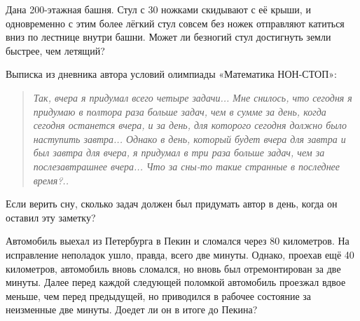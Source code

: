 ﻿

\begin{itemize}
\itA Дана 200-этажная башня. Стул с 30 ножками скидывают с её крыши, и одновременно с этим более лёгкий стул совсем без ножек отправляют катиться вниз по лестнице внутри башни. Может ли безногий стул достигнуть земли быстрее, чем летящий?

\itB Выписка из дневника автора условий олимпиады «Математика НОН-СТОП»:

\begin{quote}
\itshape Так, вчера я придумал всего четыре задачи... Мне снилось, что сегодня я придумаю в полтора раза больше задач, чем в сумме за день, когда сегодня останется вчера, и за день, для которого сегодня должно было наступить завтра... Однако в день, который будет вчера для завтра и был завтра для вчера, я придумал в три раза больше задач, чем за послезавтрашнее вчера... Что за сны-то такие странные в последнее время?..
\end{quote}

\noindent Если верить сну, сколько задач должен был придумать автор в день, когда он оставил эту заметку?

\itC Автомобиль выехал из Петербурга в Пекин и сломался через 80 километров. На исправление неполадок ушло, правда, всего две минуты. Однако, проехав ещё 40 километров, автомобиль вновь сломался, но вновь был отремонтирован за две минуты. Далее перед каждой следующей поломкой автомобиль проезжал вдвое меньше, чем перед предыдущей, но приводился в рабочее состояние за неизменные две минуты. Доедет ли он в итоге до Пекина?
\end{itemize}
